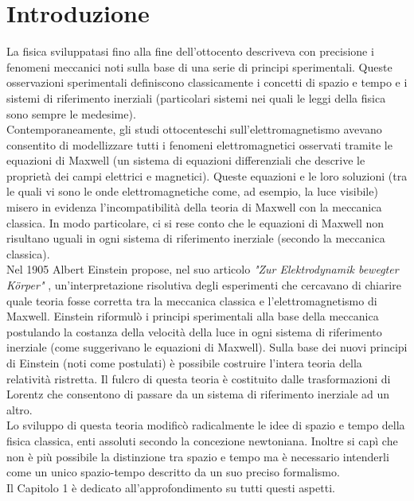 \chapter*{Introduzione}   
La fisica sviluppatasi fino alla fine dell'ottocento descriveva con precisione i fenomeni meccanici noti sulla base di una serie di principi sperimentali. Queste osservazioni sperimentali definiscono classicamente i concetti di spazio e tempo e i sistemi di riferimento inerziali (particolari sistemi nei quali le leggi della fisica sono sempre le medesime).\\
Contemporaneamente, gli studi ottocenteschi sull'elettromagnetismo avevano consentito di modellizzare tutti i fenomeni elettromagnetici osservati tramite le equazioni di Maxwell (un sistema di equazioni differenziali che descrive le proprietà dei campi elettrici e magnetici). Queste equazioni e le loro soluzioni (tra le quali vi sono le onde elettromagnetiche come, ad esempio, la luce visibile) misero in evidenza l'incompatibilità della teoria di Maxwell con la meccanica classica. In modo particolare, ci si rese conto che le equazioni di Maxwell non risultano uguali in ogni sistema di riferimento inerziale (secondo la meccanica classica).\\
Nel 1905 Albert Einstein propose, nel suo articolo \emph{"Zur Elektrodynamik bewegter Körper"} \cite{Einstein1905}, un'interpretazione risolutiva degli esperimenti che cercavano di chiarire quale teoria fosse corretta tra la meccanica classica e l'elettromagnetismo di Maxwell. Einstein riformulò i principi sperimentali alla base della meccanica postulando la costanza della velocità della luce in ogni sistema di riferimento inerziale (come suggerivano le equazioni di Maxwell). Sulla base dei nuovi principi di Einstein (noti come postulati) è possibile costruire l'intera teoria della relatività ristretta. Il fulcro di questa teoria è costituito dalle trasformazioni di Lorentz che consentono di passare da un sistema di riferimento inerziale ad un altro.\\
Lo sviluppo di questa teoria modificò radicalmente le idee di spazio e tempo della fisica classica, enti assoluti secondo la concezione newtoniana. Inoltre si capì che non è più possibile la distinzione tra spazio e tempo ma è necessario intenderli come un unico spazio-tempo descritto da un suo preciso formalismo.\\
Il Capitolo 1 è dedicato all'approfondimento su tutti questi aspetti.\\

